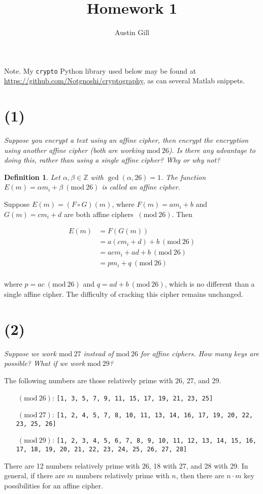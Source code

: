\documentclass[12pt]{article}
\title{Homework 1}
\author{Austin Gill}
\renewcommand{\mod}[1]{\mathrm{mod}\ #1}
\renewcommand{\pmod}[1]{\ (\mod{#1})}
\newtheorem*{defn}{Definition}
\begin{document}
\maketitle

Note. My \texttt{crypto} Python library used below may be found at \url{https://github.com/Notgnoshi/cryptography}, as can several Matlab snippets.
\section*{(1)} \textit{Suppose you encrypt a text using an affine cipher, then encrypt the encryption using another affine cipher (both are working $\mod{26}$). Is there any advantage to doing this, rather than using a single affine cipher? Why or why not?}

\begin{defn}
Let $\alpha , \beta \in \mathbb Z$ with $\gcd(\alpha , 26) = 1$. The function $E(m) = \alpha m_i + \beta \pmod{26}$ is called an affine cipher.
\end{defn}

Suppose $E(m) = (F \circ G)(m)$, where $F(m) = am_i + b$ and $G(m) = cm_i + d$ are both affine ciphers $\pmod{26}$. Then

\begin{align*}
    E(m) &= F(G(m))\\
         &= a(cm_i + d) + b \pmod{26}\\
         &= acm_i + ad + b \pmod{26}\\
         &= pm_i + q \pmod{26}\\
\end{align*}

where $p = ac \pmod{26}$ and $q = ad + b \pmod{26}$, which is no different than a single affine cipher. The difficulty of cracking this cipher remains unchanged.

\section*{(2)} \textit{Suppose we work $\mod{27}$ instead of $\mod{26}$ for affine ciphers. How many keys are possible? What if we work $\mod{29}$?}

The following numbers are those relatively prime with 26, 27, and 29.
\begin{itemize}
  \item[$\pmod{26}$:]
  \texttt{[1, 3, 5, 7, 9, 11, 15, 17, 19, 21, 23, 25]}
  \item[$\pmod{27}$:]
  \texttt{[1, 2, 4, 5, 7, 8, 10, 11, 13, 14, 16, 17, 19, 20, 22, 23, 25, 26]}
  \item[$\pmod{29}$:]
  \texttt{[1, 2, 3, 4, 5, 6, 7, 8, 9, 10, 11, 12, 13, 14, 15, 16, 17, 18, 19, 20, 21, 22, 23, 24, 25, 26, 27, 28]}
\end{itemize}
There are 12 numbers relatively prime with 26, 18 with 27, and 28 with 29. In general, if there are $m$ numbers relatively prime with $n$, then there are $n\cdot m$ key possibilities for an affine cipher.
\end{document}
